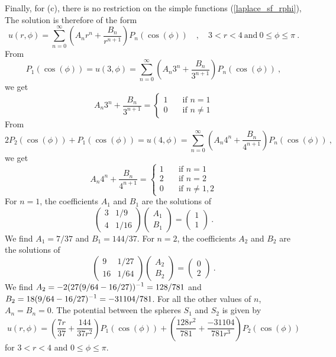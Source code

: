 \begin{egg}
Finally, for (c), there is no restriction on the simple functions
(\ref{laplace_sf_rphi}),  The solution is therefore of the form
\[
u(r,\phi) = \sum_{n=0}^\infty \left(A_n r^n + \frac{B_n}{r^{n+1}} \right)
P_n(\cos(\phi))
\quad , \quad 3 < r < 4 \ \text{and} \ 0 \leq \phi \leq \pi \ .
\]
From
\[
P_1(\cos(\phi)) = u(3,\phi)
= \sum_{n=0}^\infty \left(A_n 3^n + \frac{B_n}{3^{n+1}} \right)
P_n(\cos(\phi)) \ ,
\]
we get
\[
A_n 3^n + \frac{B_n}{3^{n+1}} = \begin{cases}
1 & \quad \text{if $n=1$}\\
0 &  \quad \text{if $n\neq 1$}
\end{cases}
\]
From
\[
2 P_2(\cos(\phi)) + P_1(\cos(\phi)) = u(4,\phi)
= \sum_{n=0}^\infty \left(A_n 4^n + \frac{B_n}{4^{n+1}} \right)
P_n(\cos(\phi)) \ ,
\]
we get
\[
A_n 4^n + \frac{B_n}{4^{n+1}} = \begin{cases}
1 & \quad \text{if $n=1$}\\
2 & \quad \text{if $n=2$} \\
0 &  \quad \text{if $n\neq 1,2$}
\end{cases}
\]
For $n=1$, the coefficients $A_1$ and $B_1$ are the solutions of
\[
\begin{pmatrix}
3 & 1/9 \\ 4 & 1/16
\end{pmatrix}
\begin{pmatrix}
A_1 \\ B_1
\end{pmatrix}
=
\begin{pmatrix}
1 \\ 1
\end{pmatrix}
\ .
\]
We find $A_1 = 7/37$ and $B_1 = 144/37$.  For $n=2$, the coefficients
$A_2$ and $B_2$ are the solutions of 
\[
\begin{pmatrix}
9 & 1/27 \\ 16 & 1/64
\end{pmatrix}
\begin{pmatrix}
A_2 \\ B_2
\end{pmatrix}
=
\begin{pmatrix}
0 \\ 2
\end{pmatrix}
\ .
\]
We find $\displaystyle A_2 = -2 (27(9/64-16/27))^{-1}= 128/781$ and\\
$\displaystyle B_2 = 18 (9/64 - 16/27)^{-1}=-31104/781$.   For all the
other values of $n$, $A_n = B_n = 0$.  The potential between the
spheres $S_1$ and $S_2$ is given by
\[
u(r,\phi) = \left(\frac{7r}{37} + \frac{144}{37r^2} \right)
P_1(\cos(\phi)) +
\left( \frac{128 r^2}{781} + \frac{ -31104}{781 r^3} \right)
P_2(\cos(\phi))
\]
for $3 < r < 4$ and $0 \leq \phi \leq \pi$.
\end{egg}

